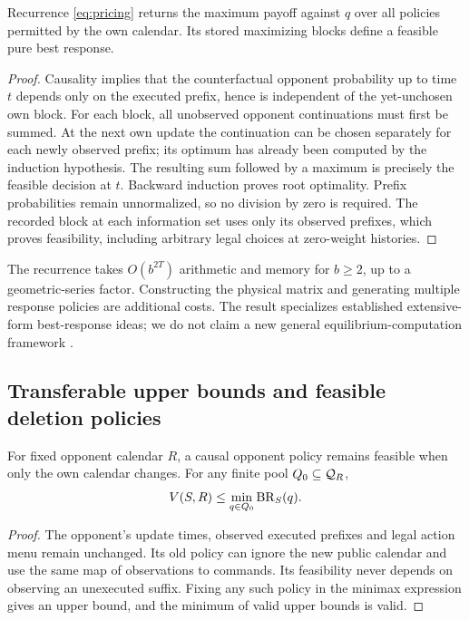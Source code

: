 \begin{theorem}\label{thm:pricing}
Recurrence \eqref{eq:pricing} returns the maximum payoff against $q$ over
all policies permitted by the own calendar. Its stored maximizing blocks
define a feasible pure best response.
\end{theorem}
\begin{proof}
Causality implies that the counterfactual opponent probability up to time
$t$ depends only on the executed prefix, hence is independent of the
yet-unchosen own block. For each block, all unobserved opponent continuations
must first be summed. At the next own update the continuation can be chosen
separately for each newly observed prefix; its optimum has already been
computed by the induction hypothesis. The resulting sum followed by a
maximum is precisely the feasible decision at $t$. Backward induction proves
root optimality. Prefix probabilities remain unnormalized, so no division
by zero is required. The recorded block at each information set uses only
its observed prefixes, which proves feasibility, including arbitrary legal
choices at zero-weight histories.
\end{proof}
The recurrence takes $O(b^{2T})$ arithmetic and memory for $b\ge2$, up to
a geometric-series factor. Constructing the physical matrix and generating
multiple response policies are additional costs. The result specializes
established extensive-form best-response ideas; we do not claim a new
general equilibrium-computation framework \citep{bosansky2014,mcaleer2021}.

\subsection{Transferable upper bounds and feasible deletion policies}
\begin{proposition}\label{prop:reuse}
For fixed opponent calendar $R$, a causal opponent policy remains feasible
when only the own calendar changes. For any finite pool $Q_0\subseteq\mathcal Q_R$,
\begin{equation}
 V(S,R)\le\min_{q\in Q_0}\operatorname{BR}_S(q).
 \label{eq:poolbound}
\end{equation}
\end{proposition}
\begin{proof}
The opponent's update times, observed executed prefixes and legal action
menu remain unchanged. Its old policy can ignore the new public calendar
and use the same map of observations to commands. Its feasibility never
depends on observing an unexecuted suffix. Fixing any such policy in the
minimax expression gives an upper bound, and the minimum of valid upper
bounds is valid.
\end{proof}

